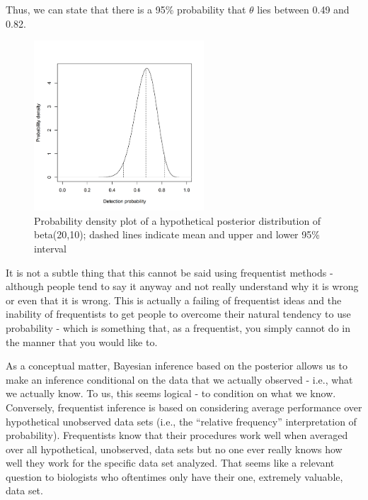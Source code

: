 Thus, we can state that there is a 95\% probability that $\theta$ lies
between 0.49 and 0.82.

\begin{figure}
\begin{center}
\includegraphics[height=2.5in]{Ch2/figs/densityvsdetection}
\end{center}
\caption{Probability density plot of a hypothetical
 posterior distribution of beta(20,10); dashed lines 
 indicate mean and upper and lower 95\% interval}
\label{densityvsdetection.fig}
\end{figure}

It is not a subtle thing that this
cannot be said using frequentist methods - although people tend to say
it anyway and not really understand why it is wrong or even that it is
wrong. This is actually a failing of frequentist ideas and the
inability of frequentists to get people to overcome their natural
tendency to use probability - which is something that, as a
frequentist, you simply cannot do in the manner that you would like
to.


As a conceptual matter, Bayesian inference based on the posterior
allows us 
 to make an inference conditional on the data that we
actually observed - i.e., what we actually know.  To us, this seems
logical - to condition on what we know. Conversely, frequentist
inference is based on considering average performance over
hypothetical unobserved data sets (i.e., the ``relative frequency''
interpretation of probability).  Frequentists know that their
procedures work well when averaged over all hypothetical, unobserved,
data sets but no one ever really knows how well they work for the
specific data set analyzed. That seems like a relevant question to
biologists who oftentimes only have their one, extremely valuable,
data set. 

